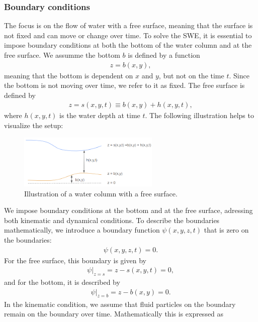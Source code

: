 \subsubsection*{Boundary conditions}
The focus is on the flow of water with a free surface, meaning that the surface is not fixed and can move or change over time.
To solve the SWE, it is essential to impose boundary conditions at both the bottom of the water column and at the free surface.
We assumme the bottom $b$ is defined by a function
\begin{align*}
    z = b(x,y),
\end{align*}
meaning that the bottom is dependent on $x$ and $y$, but not on the time $t$.
Since the bottom is not moving over time, we refer to it as fixed.
The free surface is defined by 
\begin{align*}
    z = s(x,y,t) \equiv b(x,y) + h(x,y,t),
\end{align*}
where $h(x,y,t)$ is the water depth at time $t$.
The following illustration helps to visualize the setup:
\begin{figure}[H]
    \centering
    \includegraphics[width=0.6\textwidth]{figs/water-column-bc.png}
    \caption{Illustration of a water column with a free surface.}\label{fig:water_column_bc}
\end{figure}
We impose boundary conditions at the bottom and at the free surface, adressing both kinematic and dynamical conditions.
To describe the boundaries mathematically, we introduce a boundary function $\psi(x,y,z,t)$ that is zero on the boundaries:
\begin{align*}
    \psi(x,y,z,t) = 0.
\end{align*}
For the free surface, this boundary is given by
\begin{align}\label{eq:psi_free_surface}
    \psi|_{z = s} = z - s(x,y,t) = 0,
\end{align}
and for the bottom, it is described by
\begin{align}\label{eq:psi_bottom}
    \psi|_{z = b} = z - b(x,y) = 0.
\end{align}
In the kinematic condition, we assume that fluid particles on the boundary remain on the boundary over time.
Mathematically this is expressed as
